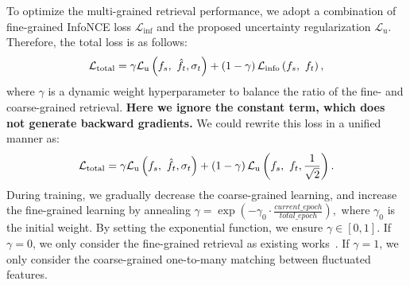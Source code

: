 \documentclass[10pt,twocolumn,letterpaper]{article}
\begin{document}
To optimize the multi-grained retrieval performance, we adopt a combination of fine-grained InfoNCE loss $\mathcal{L}_{\mathrm{inf}} $ and the proposed uncertainty regularization $\mathcal{L}_{\mathrm{u}}$. Therefore, the total loss is as follows:\vspace{-2mm}
\begin{equation}
    \mathcal{L}_{\mathrm{total}}= \gamma \mathcal{L}_{\mathrm{u}}\left( f_s,\ \hat{f_t}, \sigma_t \right) + \left(1-\gamma\right)\mathcal{L}_{\mathrm{info}} \left( f_s,\ f_t \right), 
    \label{total_loss}\vspace{-1mm}
\end{equation}
where $\gamma $ is a dynamic weight hyperparameter to balance the ratio of the fine- and coarse-grained retrieval. \textbf{Here we ignore the constant term, which does not generate backward gradients.} We could rewrite this loss in a unified manner as:\vspace{-2mm}
\begin{equation}
    \mathcal{L}_{\mathrm{total}}= \gamma \mathcal{L}_{\mathrm{u}}\left( f_s,\ \hat{f_t}, \sigma_t \right) + \left(1-\gamma\right)\mathcal{L}_{\mathrm{u}} \left( f_s,\ f_t, \frac{1}{
    \sqrt 2} \right). 
    \vspace{-1mm}
\end{equation}
During training, we gradually decrease the coarse-grained learning, and increase the fine-grained learning by annealing $\gamma=\exp(-\gamma_0\cdot \frac{current\_epoch}{total\_epoch} ),$
where $\gamma_0$ is the initial weight. By setting the exponential function, we ensure $\gamma \in [0,1]$. 
If $\gamma = 0$, we only consider the fine-grained retrieval as existing works~\cite{2021CoSMo}. If $\gamma = 1$, we only consider the coarse-grained one-to-many matching between fluctuated features.
\end{document}
